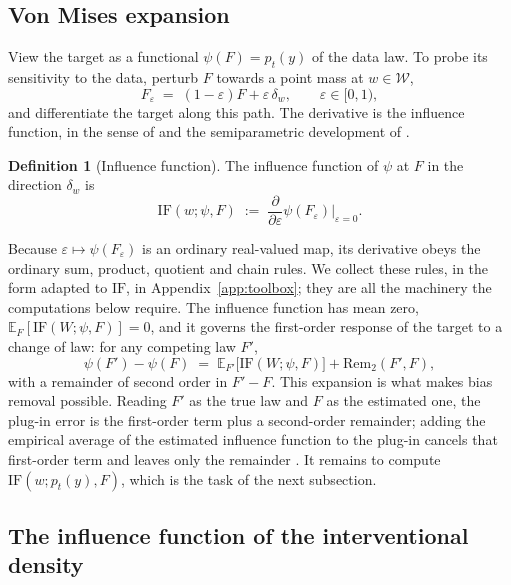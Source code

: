 \documentclass[11pt]{article}
\theoremstyle{plain}
\theoremstyle{definition}
\newtheorem{mydef}{Definition}
\theoremstyle{remark}
\newcommand{\pE}{\ensuremath{\mathbb{E}}}
\newcommand{\cW}{\ensuremath{\mathcal{W}}}
\newcommand{\IF}{\mathrm{IF}}
\newcommand{\Rem}{\mathrm{Rem}}
\begin{document}
\subsection{Von Mises expansion}
\label{sec:eif-vm}

View the target as a functional $\psi(F) = p_t(y)$ of the data law. To probe its sensitivity
to the data, perturb $F$ towards a point mass at $w \in \cW$,
\begin{equation}
F_\varepsilon \;=\; (1-\varepsilon)F + \varepsilon\,\delta_w ,
\qquad \varepsilon \in [0,1),
\label{eq:perturbation}
\end{equation}
and differentiate the target along this path. The derivative is the influence function, in the
sense of \citet{hampel1974} and the semiparametric development of \citet{bickel1993}.

\begin{mydef}[Influence function]
\label{def:if}
The influence function of $\psi$ at $F$ in the direction $\delta_w$ is
\[
\IF(w;\psi,F) \;:=\;
\frac{\partial}{\partial \varepsilon} \psi(F_\varepsilon)\Big|_{\varepsilon=0} .
\]
\end{mydef}

Because $\varepsilon \mapsto \psi(F_\varepsilon)$ is an ordinary real-valued map, its
derivative obeys the ordinary sum, product, quotient and chain rules. We collect these rules,
in the form adapted to $\IF$, in Appendix~\ref{app:toolbox}; they are all the machinery the
computations below require. The influence function has mean zero,
$\pE_F[\IF(W;\psi,F)] = 0$, and it governs the first-order response of the target to a change
of law: for any competing law $F'$,
\begin{equation}
\psi(F') - \psi(F)
\;=\; \pE_{F'}\big[\IF(W;\psi,F)\big] + \Rem_2(F',F),
\label{eq:von-mises}
\end{equation}
with a remainder of second order in $F'-F$. This expansion is what makes bias removal
possible. Reading $F'$ as the true law and $F$ as the estimated one, the plug-in error is the
first-order term plus a second-order remainder; adding the empirical average of the estimated
influence function to the plug-in cancels that first-order term and leaves only the remainder
\citep{bickel1993,vandervaart1998,vanderlaan2006tmle,chernozhukov2018}. It remains to compute
$\IF(w;p_t(y),F)$, which is the task of the next subsection.

\subsection{The influence function of the interventional density}
\label{sec:eif-classical}
\end{document}
